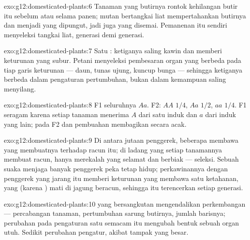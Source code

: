 \begin{solution}{exo:g12:domesticated-plants:6}
Tanaman yang butirnya rontok kehilangan butir itu sebelum atau selama
panen; mutan bertangkai liat mempertahankan butirnya dan menjadi yang
dipungut, jadi juga yang disemai. Pemanenan itu sendiri menyeleksi
 tangkai liat, generasi demi generasi.
\end{solution}

\begin{solution}{exo:g12:domesticated-plants:7}
Satu : ketiganya saling kawin dan memberi keturunan yang subur.
Petani menyeleksi pembesaran organ yang berbeda pada tiap garis
keturunan --- daun, tunas ujung, kuncup bunga --- sehingga ketiganya
berbeda dalam pengaturan pertumbuhan, bukan dalam kemampuan saling
menyilang.
\end{solution}

\begin{solution}{exo:g12:domesticated-plants:8}
F1 seluruhnya $Aa$. F2: $AA$ $1/4$, $Aa$ $1/2$, $aa$ $1/4$. F1 seragam
karena setiap tanaman menerima $A$ dari satu induk dan $a$ dari induk
yang lain; pada F2  dan pembuahan membagikan  secara
acak.
\end{solution}

\begin{solution}{exo:g12:domesticated-plants:9}
Di antara jutaan penggerek, beberapa membawa  yang membuatnya
 terhadap racun itu; di ladang yang setiap tanamannya membuat
racun, hanya merekalah yang selamat dan berbiak --- seleksi. Sebuah
suaka menjaga banyak penggerek peka tetap hidup; perkawinannya dengan
penggerek  yang jarang itu memberi keturunan yang membawa satu
 ketahanan, yang (karena ) mati di jagung beracun, sehingga
 itu terencerkan setiap generasi.
\end{solution}

\begin{solution}{exo:g12:domesticated-plants:10}
 yang bersangkutan mengendalikan perkembangan --- percabangan
tanaman, pertumbuhan sarung butirnya, jumlah barisnya; perubahan pada
pengaturan satu  semacam itu mengubah bentuk sebuah organ utuh.
Sedikit perubahan pengatur, akibat tampak yang besar.
\end{solution}

